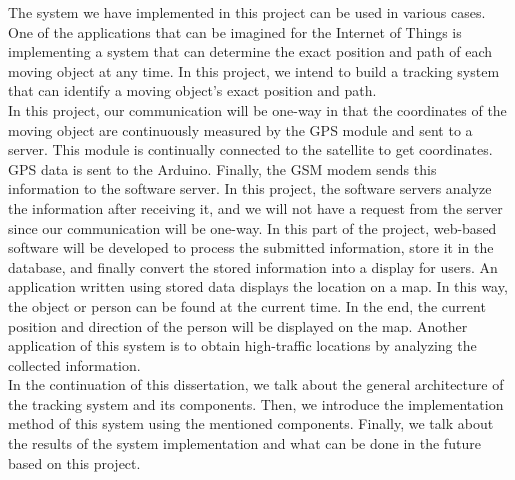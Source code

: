 The system we have implemented in this project can be used in various cases. One of the applications that can be imagined for the Internet of Things is implementing a system that can determine the exact position and path of each moving object at any time. In this project, we intend to build a tracking system that can identify a moving object's exact position and path.\\
In this project, our communication will be one-way in that the coordinates of the moving object are continuously measured by the GPS module and sent to a server. This module is continually connected to the satellite to get coordinates. GPS data is sent to the Arduino. Finally, the GSM modem sends this information to the software server. In this project, the software servers analyze the information after receiving it, and we will not have a request from the server since our communication will be one-way. In this part of the project, web-based software will be developed to process the submitted information, store it in the database, and finally convert the stored information into a display for users. An application written using stored data displays the location on a map. In this way, the object or person can be found at the current time. In the end, the current position and direction of the person will be displayed on the map. Another application of this system is to obtain high-traffic locations by analyzing the collected information.\\
In the continuation of this dissertation, we talk about the general architecture of the tracking system and its components. Then, we introduce the implementation method of this system using the mentioned components. Finally, we talk about the results of the system implementation and what can be done in the future based on this project.
